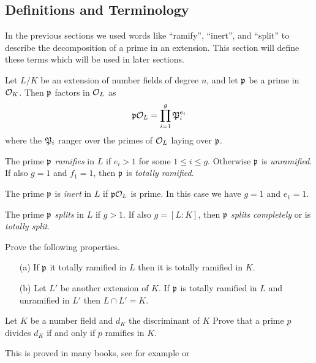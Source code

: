 \subsection{Definitions and Terminology}

In the previous sections we used words like ``ramify'',
``inert'', and ``split'' to describe the decomposition
of a prime in an extension. This section will define these
terms which will be used in later sections.

Let $L/K$ be an extension of number fields of degree $n$,
and let $\p$ be a prime in $\O_K$. Then $\p$ factors in $\O_L$ as
$$
	\p\O_L = \prod_{i=1}^g \P_i^{e_i}
$$
where the $\P_i$ ranger over the primes of $\O_L$ laying over $\p$.

\begin{definition}\label{def:ramify}
	The prime $\p$ \emph{ramifies} in $L$ if $e_i > 1$ for some $1\leq i\leq g$.
	Otherwise $\p$ is \emph{unramified}.
	If also $g = 1$ and $f_1 = 1$, then $\p$ is \emph{totally ramified}.
\end{definition}

\begin{definition}\label{def:inert}
	The prime $\p$ is \emph{inert} in $L$ if $\p\O_L$ is prime.
	In this case we have $g = 1$ and $e_1 = 1$.
\end{definition}

\begin{definition}\label{def:split}
	The prime $\p$ \emph{splits} in $L$ if $g > 1$. If also $g = [L : K]$,
	then $\p$ \emph{splits completely} or is \emph{totally split}.
\end{definition}

\begin{exercise}
	Prove the following properties.
	\begin{enumerate}
		\item[(a)] If $\p$ it totally ramified in $L$
		then it is totally ramified in $K$.
		
		\item[(b)] Let $L'$ be another extension of $K$.
		If $\p$ is totally ramified in $L$ and unramified in $L'$
		then $L\cap L' = K$.
	\end{enumerate}
\end{exercise}

\begin{exercise}
	Let $K$ be a number field and $d_K$ the discriminant of $K$
	Prove that a prime $p$ divides $d_K$ if and only if $p$ ramifies in $K$.

	\begin{hint}
		This is proved in many books, see for example
		\cite[Thm.~24]{marcus1977number} or \cite[Cor.~III.2.12]{neukirch1999}
	\end{hint}
\end{exercise}

